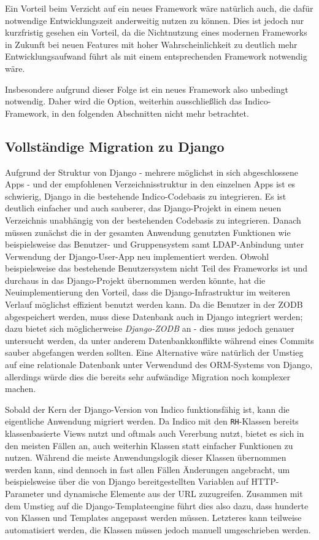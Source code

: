 Ein Vorteil beim Verzicht auf ein neues Framework wäre natürlich auch, die dafür notwendige
Entwicklungszeit anderweitig nutzen zu können. Dies ist jedoch nur kurzfristig gesehen ein Vorteil,
da die Nichtnutzung eines modernen Frameworks in Zukunft bei neuen Features mit hoher
Wahrscheinlichkeit zu deutlich mehr Entwicklungsaufwand führt als mit einem entsprechenden Framework
notwendig wäre.

Insbesondere aufgrund dieser Folge ist ein neues Framework also unbedingt notwendig. Daher wird die
Option, weiterhin ausschließlich das Indico-Framework, in den folgenden Abschnitten nicht mehr
betrachtet.


\subsection{Vollständige Migration zu Django}
Aufgrund der Struktur von Django - mehrere möglichst in sich abgeschlossene Apps - und der
empfohlenen Verzeichnisstruktur in den einzelnen Apps ist es schwierig, Django in die bestehende
Indico-Codebasis zu integrieren. Es ist deutlich einfacher und auch sauberer, das Django-Projekt in
einem neuen Verzeichnis unabhängig von der bestehenden Codebasis zu integrieren. Danach müssen
zunächst die in der gesamten Anwendung genutzten Funktionen wie beispielsweise das Benutzer- und
Gruppensystem samt LDAP-Anbindung unter Verwendung der Django-User-App neu implementiert werden.
Obwohl beispielsweise das bestehende Benutzersystem nicht Teil des Frameworks ist und durchaus in
das Django-Projekt übernommen werden könnte, hat die Neuimplementierung den Vorteil, dass die
Django-Infrastruktur im weiteren Verlauf möglichst effizient benutzt werden kann. Da die Benutzer in
der ZODB abgespeichert werden, muss diese Datenbank auch in Django integriert werden; dazu bietet
sich möglicherweise \emph{Django-ZODB} an - dies muss jedoch genauer untersucht werden, da unter
anderem Datenbankkonflikte während eines Commits sauber abgefangen werden sollten. Eine Alternative
wäre natürlich der Umstieg auf eine relationale Datenbank unter Verwendund des ORM-Systems von
Django, allerdings würde dies die bereits sehr aufwändige Migration noch komplexer machen.

Sobald der Kern der Django-Version von Indico funktionsfähig ist, kann die eigentliche Anwendung
migriert werden. Da Indico mit den \lstinline{RH}-Klassen bereits klassenbasierte Views nutzt und
oftmals auch Vererbung nutzt, bietet es sich in den meisten Fällen an, auch weiterhin Klassen statt
einfacher Funktionen zu nutzen. Während die meiste Anwendungslogik dieser Klassen übernommen werden
kann, sind dennoch in fast allen Fällen Änderungen angebracht, um beispielsweise über die von Django
bereitgestellten Variablen auf HTTP-Parameter und dynamische Elemente aus der URL zuzugreifen.
Zusammen mit dem Umstieg auf die Django-Templateengine führt dies also dazu, dass hunderte von
Klassen und Templates angepasst werden müssen. Letzteres kann teilweise automatisiert werden, die
Klassen müssen jedoch manuell umgeschrieben werden.

